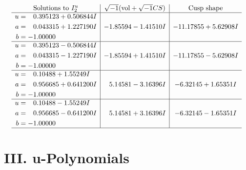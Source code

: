 \documentclass[1p]{elsarticle_modified}
\theoremstyle{definition}
\newcommand{\I}{\sqrt{-1}}
\begin{document}
$$\begin{array}{c|c|c}  
\text{Solutions to }I^u_{2}& \I (\text{vol} + \sqrt{-1}CS) & \text{Cusp shape}\\
 \hline 
\begin{aligned}
u &= \phantom{-}0.395123 + 0.506844 I \\
a &= \phantom{-}0.043315 + 1.227190 I \\
b &= -1.00000\phantom{ +0.000000I}\end{aligned}
 & -1.85594 - 1.41510 I & -11.17855 + 5.62908 I \\ \hline\begin{aligned}
u &= \phantom{-}0.395123 - 0.506844 I \\
a &= \phantom{-}0.043315 - 1.227190 I \\
b &= -1.00000\phantom{ +0.000000I}\end{aligned}
 & -1.85594 + 1.41510 I & -11.17855 - 5.62908 I \\ \hline\begin{aligned}
u &= \phantom{-}0.10488 + 1.55249 I \\
a &= \phantom{-}0.956685 + 0.641200 I \\
b &= -1.00000\phantom{ +0.000000I}\end{aligned}
 & \phantom{-}5.14581 - 3.16396 I & -6.32145 + 1.65351 I \\ \hline\begin{aligned}
u &= \phantom{-}0.10488 - 1.55249 I \\
a &= \phantom{-}0.956685 - 0.641200 I \\
b &= -1.00000\phantom{ +0.000000I}\end{aligned}
 & \phantom{-}5.14581 + 3.16396 I & -6.32145 - 1.65351 I\\
 \hline 
 \end{array}$$\newpage
\newpage\renewcommand{\arraystretch}{1}
\centering \section*{ III. u-Polynomials}
\end{document}

